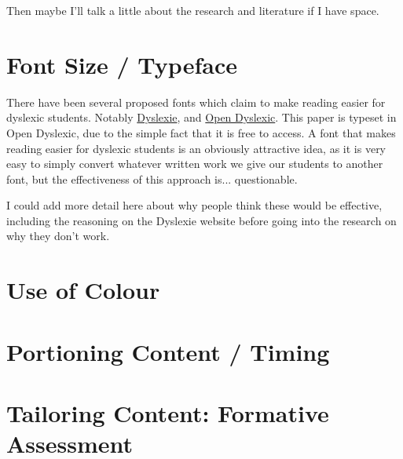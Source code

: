 \documentclass[12pt]{article}
\begin{document}
Then maybe I'll talk a little about the research and literature if I have space.

\section{Font Size / Typeface}

There have been several proposed fonts which claim to make reading easier for dyslexic students. Notably \href{https://www.dyslexiefont.com/en/typeface/}{Dyslexie}, and \href{https://www.opendyslexic.org/}{Open Dyslexic}. This paper is typeset in Open Dyslexic, due to the simple fact that it is free to access. A font that makes reading easier for dyslexic students is an obviously attractive idea, as it is very easy to simply convert whatever written work we give our students to another font, but the effectiveness of this approach is... questionable.

I could add more detail here about why people think these would be effective, including the reasoning on the Dyslexie website before going into the research on why they don't work.

\cite{Marinus2016}
\cite{Wery2017}
\cite{French2013}
\cite{Rello2013}
\cite{Leeuw2010}


\section{Use of Colour}

\cite{Ludlow2006}
\cite{Jeanes1997}
\cite{Wilkins1994}
\cite{Singleton2005}
\cite{Henderson2013}
\cite{Lightstone1999}


\section{Portioning Content / Timing}

\section{Tailoring Content: Formative Assessment}






 
\end{document}
